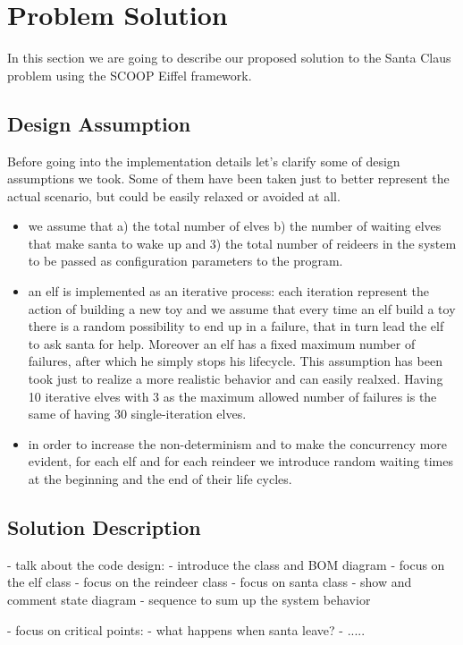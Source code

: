 \section{Problem Solution}
\label{sec:solution}

In this section we are going to describe our proposed solution to the Santa Claus problem using the SCOOP Eiffel framework. 

\subsection{Design Assumption}
\label{subsec:design}

Before going into the implementation details let's clarify some of design assumptions we took. Some of them have been taken just to better represent the actual scenario, but could be easily relaxed or avoided at all.

\begin{itemize}
	\item we assume that a) the total number of elves b) the number of waiting elves that make santa to wake up and 3) the total number of reideers in the system to be passed as configuration parameters to the program.
	\item an elf is implemented as an iterative process: each iteration represent the action of building a new toy and we assume that every time an elf build a toy there is a random possibility to end up in a failure, that in turn lead the elf to ask santa for help. Moreover an elf has a fixed maximum number of failures, after which he simply stops his lifecycle. This assumption has been took just to realize a more realistic behavior and can easily realxed. Having 10 iterative elves with 3 as the maximum allowed number of failures is the same of having 30 single-iteration elves.
	\item in order to increase the non-determinism and to make the concurrency more evident, for each elf and for each reindeer we introduce random waiting times at the beginning and the end of their life cycles.
\end{itemize}

\subsection{Solution Description}
\label{subsec:sol}

- talk about the code design: 
- introduce the class and BOM diagram
- focus on the elf class
- focus on the reindeer class
- focus on santa class
- show and comment state diagram
- sequence to sum up the system behavior

- focus on critical points:
- what happens when santa leave?
- .....
